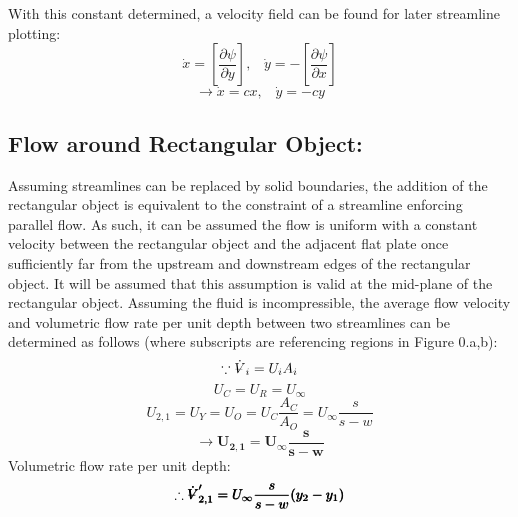 \documentclass[12pt]{article}
\makeatletter
\DeclareRobustCommand{\volume}{\text{\volumedash}V}
\newcommand{\volumedash}{%
	\makebox[0pt][l]{%
		\ooalign{\hfil\hphantom{$\m@th V$}\hfil\cr\kern0.08em--\hfil\cr}%
	}%
}
\makeatother
\begin{document}
	With this constant determined, a velocity field can be found for later streamline plotting:
	$$ \dot x = \left[\frac{\partial\psi}{\partial y}\right],\;\;\;\dot y = -\left[\frac{\partial\psi}{\partial x}\right]$$
	\begin{equation}
		\rightarrow \dot x = cx,\;\;\; \dot y = -cy
	\end{equation}
	
	\hfill\break\break
	\subsection{Flow around Rectangular Object:}
	Assuming streamlines can be replaced by solid boundaries, the addition of the rectangular object is equivalent to the constraint of a streamline enforcing parallel flow. As such, it can be assumed the flow is uniform with a constant velocity between the rectangular object and the adjacent flat plate once sufficiently far from the upstream and downstream edges of the rectangular object. It will be assumed that this assumption is valid at the mid-plane of the rectangular object.
	\hfill\break
	Assuming the fluid is incompressible, the average flow velocity and volumetric flow rate per unit depth between two streamlines can be determined as follows (where subscripts are referencing regions in Figure 0.a,b):
	$$\because \dot{\volume}_{i}=U_iA_i$$
	$$U_{C}=U_{R}=U_\infty$$
	$$U_{2,1}=U_{Y}=U_{O}=U_{C}\frac{A_{C}}{A_{O}}=U_\infty\frac{s}{s-w}$$
	\begin{equation}
		\rightarrow \pmb{U_{2,1}=U_\infty\frac{s}{s-w}}
	\end{equation}
	Volumetric flow rate per unit depth:
	 \begin{equation}
		\therefore \pmb{\dot{\volume}_{2,1}'=U_\infty\frac{s}{s-w}(y_2-y_1)}
	 \end{equation}
\end{document}
